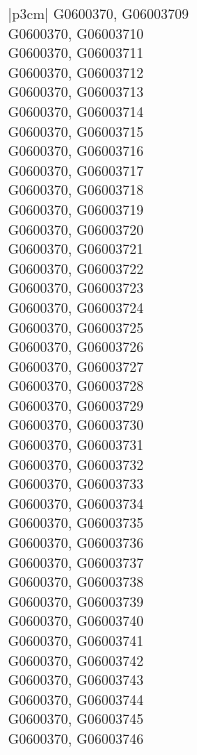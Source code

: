 \begin{customLongTable}{ |p{3cm}| }
G0600370, G06003709 \\ \hline
G0600370, G06003710 \\ \hline
G0600370, G06003711 \\ \hline
G0600370, G06003712 \\ \hline
G0600370, G06003713 \\ \hline
G0600370, G06003714 \\ \hline
G0600370, G06003715 \\ \hline
G0600370, G06003716 \\ \hline
G0600370, G06003717 \\ \hline
G0600370, G06003718 \\ \hline
G0600370, G06003719 \\ \hline
G0600370, G06003720 \\ \hline
G0600370, G06003721 \\ \hline
G0600370, G06003722 \\ \hline
G0600370, G06003723 \\ \hline
G0600370, G06003724 \\ \hline
G0600370, G06003725 \\ \hline
G0600370, G06003726 \\ \hline
G0600370, G06003727 \\ \hline
G0600370, G06003728 \\ \hline
G0600370, G06003729 \\ \hline
G0600370, G06003730 \\ \hline
G0600370, G06003731 \\ \hline
G0600370, G06003732 \\ \hline
G0600370, G06003733 \\ \hline
G0600370, G06003734 \\ \hline
G0600370, G06003735 \\ \hline
G0600370, G06003736 \\ \hline
G0600370, G06003737 \\ \hline
G0600370, G06003738 \\ \hline
G0600370, G06003739 \\ \hline
G0600370, G06003740 \\ \hline
G0600370, G06003741 \\ \hline
G0600370, G06003742 \\ \hline
G0600370, G06003743 \\ \hline
G0600370, G06003744 \\ \hline
G0600370, G06003745 \\ \hline
G0600370, G06003746 \\ \hline

\end{customLongTable}
